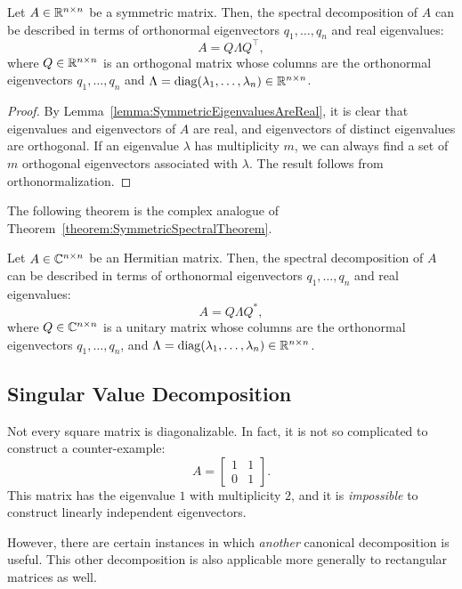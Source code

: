 \begin{theorem}\label{theorem:SymmetricSpectralTheorem}
Let $A\in\mathbb{R}^{n\times n}$ be a symmetric matrix. Then, the spectral decomposition of $A$ can be described in terms of orthonormal eigenvectors $q_1,\ldots,q_n$ and real eigenvalues:
\[
A = Q\Lambda Q^\top,
\]
where $Q\in\mathbb{R}^{n\times n}$ is an orthogonal matrix whose columns are the orthonormal eigenvectors $q_1,\ldots,q_n$ and $\Lambda = \operatorname{diag}(\lambda_1,\ldots,\lambda_n)\in\mathbb{R}^{n\times n}$.
\end{theorem}
\begin{proof}
By Lemma~\ref{lemma:SymmetricEigenvaluesAreReal}, it is clear that eigenvalues and eigenvectors of $A$ are real, and eigenvectors of distinct eigenvalues are orthogonal. If an eigenvalue $\lambda$ has multiplicity $m$, we can always find a set of $m$ orthogonal eigenvectors associated with $\lambda$. The result follows from orthonormalization.
\end{proof}

The following theorem is the complex analogue of Theorem~\ref{theorem:SymmetricSpectralTheorem}.

\begin{theorem}\label{theorem:HermitianSpectralTheorem}
Let $A\in\mathbb{C}^{n\times n}$ be an Hermitian matrix. Then, the spectral decomposition of $A$ can be described in terms of orthonormal eigenvectors $q_1,\ldots,q_n$ and real eigenvalues:
\[
A = Q\Lambda Q^*,
\]
where $Q\in\mathbb{C}^{n\times n}$ is a unitary matrix whose columns are the orthonormal eigenvectors $q_1,\ldots,q_n$, and $\Lambda = \operatorname{diag}(\lambda_1,\ldots,\lambda_n)\in\mathbb{R}^{n\times n}$.
\end{theorem}

\subsection{Singular Value Decomposition}

Not every square matrix is diagonalizable. In fact, it is not so complicated to construct a counter-example:
\[
A = \begin{bmatrix} 1 & 1\\ 0 & 1\end{bmatrix}.
\]
This matrix has the eigenvalue $1$ with multiplicity $2$, and it is {\em impossible} to construct linearly independent eigenvectors.

However, there are certain instances in which {\em another} canonical decomposition is useful. This other decomposition is also applicable more generally to rectangular matrices as well.

